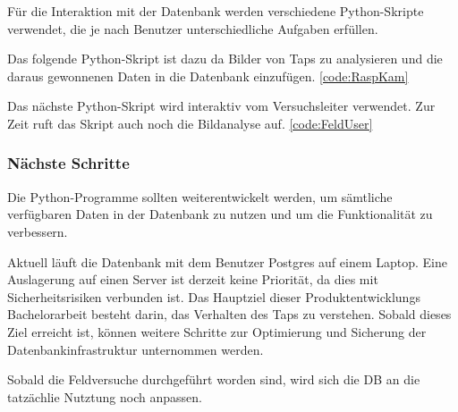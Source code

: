 Für die Interaktion mit der Datenbank werden verschiedene Python-Skripte verwendet, die je nach Benutzer unterschiedliche Aufgaben erfüllen.

Das folgende Python-Skript ist dazu da Bilder von Taps zu analysieren und die daraus gewonnenen Daten in die Datenbank einzufügen. \ref{code:RaspKam}

Das nächste Python-Skript wird interaktiv vom Versuchsleiter verwendet. Zur Zeit ruft das Skript auch noch die Bildanalyse auf. \ref{code:FeldUser}


\subsubsection{Nächste Schritte}

Die Python-Programme sollten weiterentwickelt werden, um sämtliche verfügbaren Daten in der Datenbank zu nutzen und um die Funktionalität zu verbessern.

Aktuell läuft die Datenbank mit dem Benutzer Postgres auf einem Laptop. Eine Auslagerung auf einen Server ist derzeit keine Priorität, da dies mit Sicherheitsrisiken verbunden ist. Das Hauptziel dieser Produktentwicklungs Bachelorarbeit besteht darin, das Verhalten des Taps zu verstehen. Sobald dieses Ziel erreicht ist, können weitere Schritte zur Optimierung und Sicherung der Datenbankinfrastruktur unternommen werden.

Sobald die Feldversuche durchgeführt worden sind, wird sich die DB an die tatzächlie Nutztung noch anpassen.

